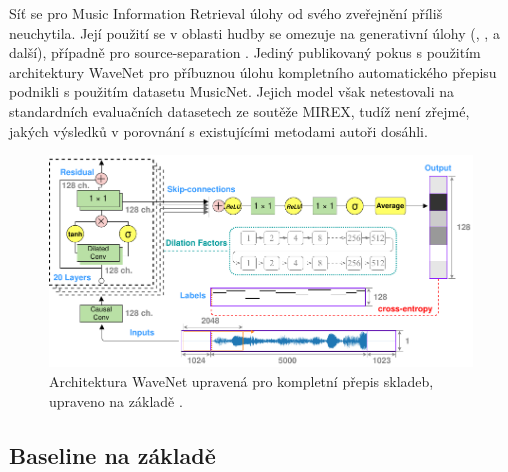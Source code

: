 Síť se pro Music Information Retrieval úlohy od svého zveřejnění příliš neuchytila. Její použití se v oblasti hudby se omezuje na generativní úlohy (\cite{Hawthorne2018a}, \cite{Yang2017}, \cite{Engel2017} a další), případně pro source-separation \citep{Stoller2018}. Jediný publikovaný pokus s použitím architektury WaveNet pro příbuznou úlohu kompletního automatického přepisu podnikli \cite{Martak2018} s použitím datasetu MusicNet. Jejich model však netestovali na standardních evaluačních datasetech ze soutěže MIREX, tudíž není zřejmé, jakých výsledků v porovnání s existujícími metodami autoři dosáhli.



\begin{figure}[h]\centering
\includegraphics{../img/wavenet_arch}
\caption{Architektura WaveNet upravená pro kompletní přepis skladeb, upraveno na základě \cite{Martak2018}.}
\label{obr:wavenet_arch}
\end{figure}

\subsection{Baseline na základě \cite{Martak2018}}



